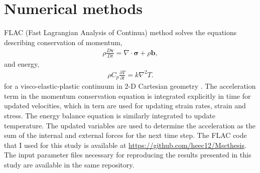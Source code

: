 \documentclass[letterpaper,12pt,notitle]{memphisthesis}                     %
\begin{document}

%
%
%
%

\section{Numerical methods}
FLAC (Fast Lagrangian Analysis of Continua) method solves the equations describing conservation of momentum,
\begin{align}
\rho \frac{D \mathbf{v}}{Dt} = \nabla \cdot \boldsymbol{\sigma} + \rho \mathbf{b},
\end{align}
%
and energy, 
\begin{align}
\rho C_{p} \frac{\partial T}{\partial t} = k \nabla^2 T.
\end{align}
%
for a visco-elastic-plastic continuum in 2-D Cartesian geometry \citep{Cundall1982, Poliakov1993, Lavier2002}. The acceleration term in the momentum conservation equation is  integrated explicitly in time for updated velocities, which in tern are used for updating strain rates, strain and stress. The energy balance equation is similarly integrated to update temperature. The updated variables are used to determine the acceleration as the sum of the internal and external forces for the next time step. The FLAC code that I used for this study is available at \url{https://github.com/heec12/Mscthesis}. The input parameter files necessary for reproducing the results presented in this study are available in the same repository.
\end{document}
